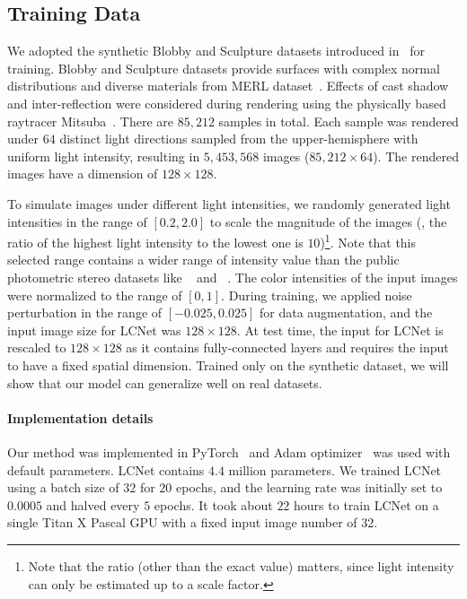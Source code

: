 \subsection{Training Data}
We adopted the synthetic Blobby and Sculpture datasets introduced in~ for training.
Blobby and Sculpture datasets provide surfaces with complex normal distributions and diverse materials from MERL dataset~\cite{matusik2003merl}. Effects of cast shadow and inter-reflection were considered during rendering using the physically based raytracer Mitsuba~\cite{jakob2010mitsuba}. There are $85,212$ samples in total. Each sample was rendered under $64$ distinct light directions sampled from the upper-hemisphere with uniform light intensity, resulting in $5,453,568$ images ($85,212 \times 64$). The rendered images have a dimension of $128\times 128$.

To simulate images under different light intensities, we randomly generated light intensities in the range of $[0.2, 2.0]$ to scale the magnitude of the images (\ie, the ratio of the highest light intensity to the lowest one is $10$)\footnote{Note that the ratio (other than the exact value) matters, since light intensity can only be estimated up to a scale factor.}. Note that this selected range contains a wider range of intensity value than the public photometric stereo datasets like \diligent~\cite{shi2019benchmark} and \gourd~\cite{alldrin2008p}. The color intensities of the input images were normalized to the range of $[0, 1]$. 
During training, we applied noise perturbation in the range of $[-0.025, 0.025]$ for data augmentation, and the input image size for LCNet was $128\times 128$. At test time, the input for LCNet is rescaled to $128\times 128$ as it contains fully-connected layers and requires the input to have a fixed spatial dimension. Trained only on the synthetic dataset, we will show that our model can generalize well on real datasets.

\paragraph{Implementation details}
Our method was implemented in PyTorch~\cite{paszke2017pytorch} and Adam optimizer~\cite{kingma2014adam} was used with default parameters. LCNet contains $4.4$ million parameters.
We trained LCNet using a batch size of $32$ for $20$ epochs, and the learning rate was initially set to $0.0005$ and halved every $5$ epochs.
It took about $22$ hours to train LCNet on a single Titan X Pascal GPU with a fixed input image number of $32$.

